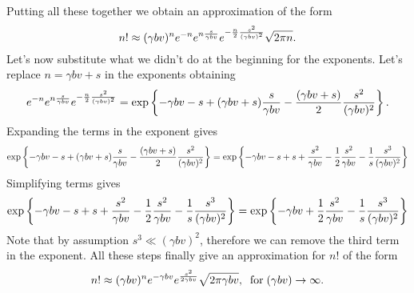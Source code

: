 Putting all these together we obtain an approximation of the form
\begin{equation}
  n! \approx (\gamma b v)^n
             e^{-n}
             e^{n {s \over \gamma b v}}
             e^{-{n \over 2} {s^2 \over (\gamma b v)^2}}
             \sqrt{2 \pi n}.
\end{equation}
Let's now substitute what we didn't do at the beginning for the exponents.
Let's replace $n = \gamma b v + s$ in the exponents obtaining
\begin{equation}
  e^{-n}
  e^{n {s \over \gamma b v}}
  e^{-{n \over 2} {s^2 \over (\gamma b v)^2}} =
  \exp \left\{ -\gamma b v - s
               + (\gamma b v + s){s \over \gamma b v}
               - {(\gamma b v + s) \over 2} {s^2 \over (\gamma b v)^2} \right\}.
\end{equation}
Expanding the terms in the exponent gives
\begin{equation}
\exp \left\{ -\gamma b v - s
             + (\gamma b v + s){s \over \gamma b v}
             - {(\gamma b v + s) \over 2} {s^2 \over (\gamma b v)^2} \right\} =
\exp \left\{ -\gamma b v - s
             + s
             + {s^2 \over \gamma b v}
             - {1 \over 2} {s^2 \over \gamma b v}
             - {1 \over s} {s^3 \over (\gamma b v)^2} \right\}
\end{equation}
Simplifying terms gives
\begin{equation}
  \exp \left\{ -\gamma b v
             - s
             + s
             + {s^2 \over \gamma b v}
             - {1 \over 2} {s^2 \over \gamma b v}
             - {1 \over s} {s^3 \over (\gamma b v)^2} \right\} =
\exp \left\{ -\gamma b v
             + {1 \over 2} {s^2 \over \gamma b v}
             - {1 \over s} {s^3 \over (\gamma b v)^2} \right\}
\end{equation}
Note that by assumption $s^3 \ll (\gamma b v)^2$, therefore we can remove the
third term in the exponent. All these steps finally give an approximation for
$n!$ of the form
\begin{equation}
  n! \approx (\gamma b v)^n e^{-\gamma b v} e^{s^2 \over 2 \gamma b v}
             \sqrt{2 \pi \gamma b v}, \;\;
             \text{for} \; (\gamma b v) \rightarrow \infty.
\end{equation}

